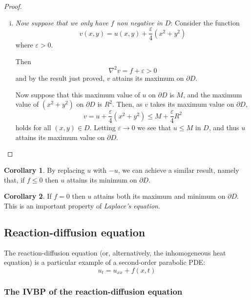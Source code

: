 \documentclass[10pt,fleqn]{article}
\newcommand{\eps}{\varepsilon}
\theoremstyle{definition} \newtheorem{defn}{Definition}[section]
\theoremstyle{plain}      \newtheorem{thm}[defn]{Theorem}
\theoremstyle{plain}      \newtheorem{lem}[defn]{Lemma}
\theoremstyle{definition} \newtheorem{prop}[defn]{Proposition}
\theoremstyle{definition} \newtheorem{cor}[defn]{Corollary}
\theoremstyle{definition} \newtheorem{ex}[defn]{Example}
\theoremstyle{definition} \newtheorem{rem}[defn]{Remark}
\begin{document}
{\begin{proof}
\begin{enumerate}[(i)]
        But then
        $0<f(x,y)=u_{xx}+u_{yy}\leq0$
        which is a contradiction.

        Hence $u$ cannot have an interior maximum within $D$, so it must attain its maximum on $\partial D$.
        \item \emph{Now suppose that we only have $f$ non negative in $D$}:
        Consider the function
        \[
            v(x,y)=u(x,y)+\frac{\eps}{4}(x^2+y^2)
        \]
        where $\eps>0$.

        Then
        \[
            \nabla^2 v=f+\eps>0
        \]
        and by the result just proved, $v$ attains its maximum on $\partial D$.

        Now suppose that this maximum value of $u$ on $\partial D$ is $M$, and the maximum value of $(x^2+y^2)$ on $\partial D$ is $R^2$.
        Then, as $v$ takes its maximum value on $\partial D$,
        \[
            v=
            u+\frac{\eps}{4}(x^2+y^2)\leq
            M+\frac{\eps}{4}R^2
        \]
        holds for all $(x,y)\in D$.
        Letting $\eps\to0$ we see that $u\leq M$ in $D$, and thus $u$ attains its maximum value on $\partial D$.
    \end{enumerate}
\end{proof}

\begin{cor}
    By replacing $u$ with $-u$, we can achieve a similar result, namely that, if $f\leq0$ then $u$ attains its minimum on $\partial D$.
\end{cor}

\begin{cor}
    If $f=0$ then $u$ attains both its maximum and minimum on $\partial D$.
    This is an important property of \emph{Laplace's equation}.
\end{cor}


\subsection{Reaction-diffusion equation}

The reaction-diffusion equation (or, alternatively, the inhomogeneous heat equation) is a particular example of a second-order parabolic PDE:
\begin{equation}
    u_t=u_{xx}+f(x,t)
\end{equation}

\subsubsection{The IVBP of the reaction-diffusion equation}

}
\end{document}
